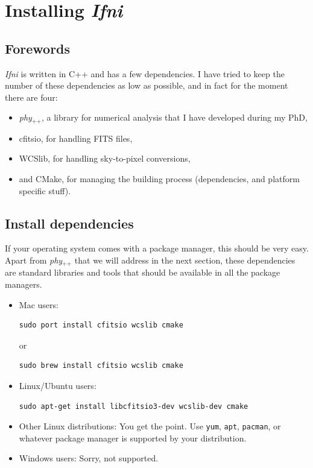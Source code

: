\documentclass[12pt,a4paper]{article}
\newcommand{\phypp}{\textit{phy}$_{\text{++}}$\xspace}
\newcommand{\ifni}{\textit{Ifni}\xspace}
\begin{document}
\newpage

\section{Installing \ifni}

\subsection{Forewords}

\ifni is written in C++ and has a few dependencies. I have tried to keep the number of these dependencies as low as possible, and in fact for the moment there are four:

\begin{itemize}
\item \phypp, a library for numerical analysis that I have developed during my PhD,
\item cfitsio, for handling FITS files,
\item WCSlib, for handling sky-to-pixel conversions,
\item and CMake, for managing the building process (dependencies, and platform specific stuff).
\end{itemize}

\subsection{Install dependencies}

If your operating system comes with a package manager, this should be very easy. Apart from \phypp that we will address in the next section, these dependencies are standard libraries and tools that should be available in all the package managers.

\begin{itemize}
\item Mac users:
\begin{verbatim}
sudo port install cfitsio wcslib cmake
\end{verbatim}
or
\begin{verbatim}
sudo brew install cfitsio wcslib cmake
\end{verbatim}
\item Linux/Ubuntu users:
\begin{verbatim}
sudo apt-get install libcfitsio3-dev wcslib-dev cmake
\end{verbatim}
\item Other Linux distributions: You get the point. Use \texttt{yum}, \texttt{apt}, \texttt{pacman}, or whatever package manager is supported by your distribution.
\item Windows users: Sorry, not supported.
\end{itemize}
\end{document}
